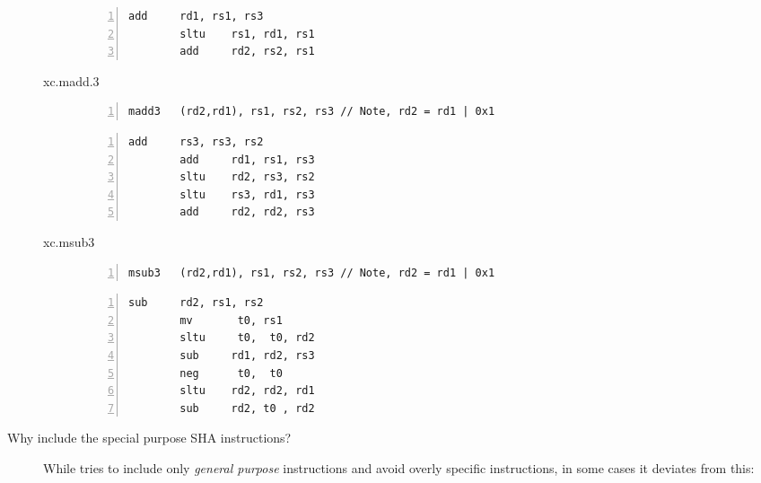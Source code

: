 \begin{description}
\begin{description}
        \begin{lstlisting}[frame=single, title=RISC-V RV32IM / RV64IM,numbers=left]
        add     rd1, rs1, rs3
        sltu    rs1, rd1, rs1
        add     rd2, rs2, rs1
        \end{lstlisting}

    \item[xc.madd.3] \hfill

        \begin{lstlisting}[frame=single,title=XCRYPTOrypto,numbers=left]
        madd3   (rd2,rd1), rs1, rs2, rs3 // Note, rd2 = rd1 | 0x1
        \end{lstlisting}

        \begin{lstlisting}[frame=single, title=RISC-V RV32IM / RV64IM,numbers=left]
        add     rs3, rs3, rs2
        add     rd1, rs1, rs3
        sltu    rd2, rs3, rs2
        sltu    rs3, rd1, rs3
        add     rd2, rd2, rs3
        \end{lstlisting}

    \item[xc.msub3] \hfill

        \begin{lstlisting}[frame=single,title=XCRYPTOrypto,numbers=left]
        msub3   (rd2,rd1), rs1, rs2, rs3 // Note, rd2 = rd1 | 0x1
        \end{lstlisting}

        \begin{lstlisting}[frame=single, title=RISC-V RV32IM / RV64IM,numbers=left]
        sub     rd2, rs1, rs2
        mv       t0, rs1
        sltu     t0,  t0, rd2
        sub     rd1, rd2, rs3
        neg      t0,  t0
        sltu    rd2, rd2, rd1
        sub     rd2, t0 , rd2
        \end{lstlisting}

    \end{description}


\item[Why include the special purpose SHA instructions?]
      While \XCRYPTO tries to include only {\em general purpose} instructions and
      avoid overly specific instructions, in some cases it deviates from this:


\end{description}
